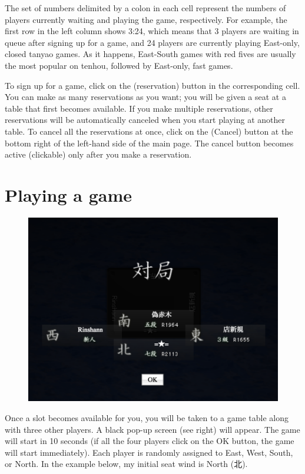 \bigskip
The set of numbers delimited by a colon in each cell represent the numbers of players currently waiting and playing the game, respectively. For example, the first row in the left column shows 3:24, which means that 3 players are waiting in queue after signing up for a game, and 24 players are currently playing East-only, closed {\jap tanyao} games. As it happens, East-South games with red fives are usually the most popular on {\jap tenhou}, followed by East-only, fast games. 

\bigskip
To sign up for a game, click on the  (reservation) button in the corresponding cell. You can make as many reservations as you want; you will be given a seat at a table that first becomes available. If you make multiple reservations, other reservations will be automatically canceled when you start playing at another table. To cancel all the reservations at once, click on the  (Cancel) button at the bottom right of the left-hand side of the main page. The cancel button becomes active (clickable) only after you make a reservation. 

\section{Playing a game}

\begin{figure}
\vspace{-20pt}
\begin{center}
\includegraphics[width=.4\textwidth,clip]{figs/taikyoku}
\end{center}
\vspace{-20pt}
\end{figure}

Once a slot becomes available for you, you will be taken to a game table along with three other players. A black pop-up screen (see right) will appear. The game will start in 10 seconds (if all the four players click on the OK button, the game will start immediately). Each player is randomly assigned to East, West, South, or North. In the example below, my initial seat wind is North (北). 

